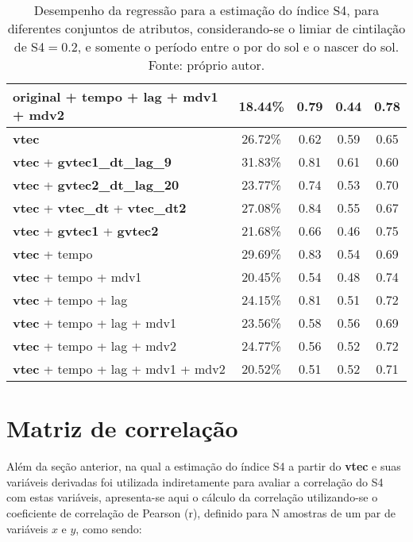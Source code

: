 \begin{table}
\begin{center}
\begin{tabular}{|l|c|c|c|c|}
original + tempo + lag + mdv1 + mdv2          &  18.44\%  & 0.79  & 0.44  & 0.78 \\ \hline
{\bf vtec}                                    &  26.72\%  & 0.62  & 0.59  & 0.65 \\ \hline
{\bf vtec} + {\bf gvtec1\_dt\_lag\_9}         &  31.83\%  & 0.81  & 0.61  & 0.60 \\ \hline
{\bf vtec} + {\bf gvtec2\_dt\_lag\_20}        &  23.77\%  & 0.74  & 0.53  & 0.70 \\ \hline
{\bf vtec} + {\bf vtec\_dt} + {\bf vtec\_dt2} &  27.08\%  & 0.84  & 0.55  & 0.67 \\ \hline
{\bf vtec} + {\bf gvtec1} + {\bf gvtec2}      &  21.68\%  & 0.66  & 0.46  & 0.75 \\ \hline
{\bf vtec} + tempo                            &  29.69\%  & 0.83  & 0.54  & 0.69 \\ \hline
{\bf vtec} + tempo + mdv1                     &  20.45\%  & 0.54  & 0.48  & 0.74 \\ \hline
{\bf vtec} + tempo + lag                      &  24.15\%  & 0.81  & 0.51  & 0.72 \\ \hline
{\bf vtec} + tempo + lag + mdv1               &  23.56\%  & 0.58  & 0.56  & 0.69 \\ \hline
{\bf vtec} + tempo + lag + mdv2               &  24.77\%  & 0.56  & 0.52  & 0.72 \\ \hline
{\bf vtec} + tempo + lag + mdv1 + mdv2        &  20.52\%  & 0.51  & 0.52  & 0.71 \\ \hline
\end{tabular}
\end{center}
\vspace{12pt}
\caption{Desempenho da regressão para a estimação do índice S4, para diferentes conjuntos de atributos, considerando-se o limiar de cintilação de S4$=0.2$, e somente o período entre o por do sol e o nascer do sol. Fonte: próprio autor.}
\label{tab:final_result3}
\end{table}

\clearpage

\section{Matriz de correlação}

Além da seção anterior, na qual a estimação do índice S4 a partir do {\bf vtec} e suas variáveis derivadas foi utilizada indiretamente para avaliar a correlação do S4 com estas variáveis, apresenta-se aqui o cálculo da correlação utilizando-se o coeficiente de correlação de Pearson (r), definido para N amostras de um par de variáveis $x$ e $y$, como sendo: 

